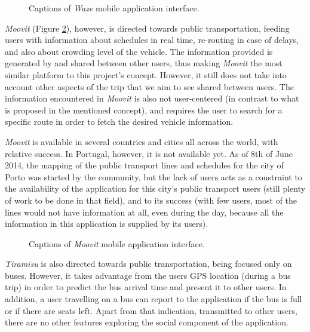 \begin{figure}[h]
\begin{center}
\leavevmode
{} \hspace{1em}%
\caption{Captions of \emph{Waze} mobile application interface.}
\label{fig:waze}
\end{center}
\end{figure}

\emph{Moovit} (Figure \ref{fig:moovit}), however, is directed towards public transportation, feeding users with information about schedules in real time, re-routing in case of  delays, and also about crowding level of the vehicle.
The information provided is generated by and shared between other users, thus making \emph{Moovit} the most similar platform to this project's concept. However, it still does not take into account other aspects of the trip that we aim to see shared between users. The information encountered in \emph{Moovit} is also not user-centered (in contrast to what is proposed in the mentioned concept), and requires the user to search for a specific route in order to fetch the desired vehicle information.

\emph{Moovit} is available in several countries and cities all across the world, with relative success. 
In Portugal, however, it is not available yet. As of 8th of June 2014, the mapping of the public transport lines and schedules for the city of Porto was started by the community, but the lack of users acts as a constraint to the availability of the application for this city's public transport users (still plenty of work to be done in that field), and to its success (with few users, most of the lines would not have information at all, even during the day, because all the information in this application is supplied by its users). 

\begin{figure}[h]
\begin{center}
\leavevmode
{} \hspace{1em}%
\caption{Captions of \emph{Moovit} mobile application interface.}
\label{fig:moovit}
\end{center}
\end{figure}

\emph{Tiramisu} is also directed towards public transportation, being focused only on buses. However, it takes advantage from the users GPS location (during a bus trip) in order to predict the bus arrival time and present it to other users. In addition, a user travelling on a bus can report to the application if the bus is full or if there are seats left. Apart from that indication, transmitted to other users, there are no other features exploring the social component of the application.


